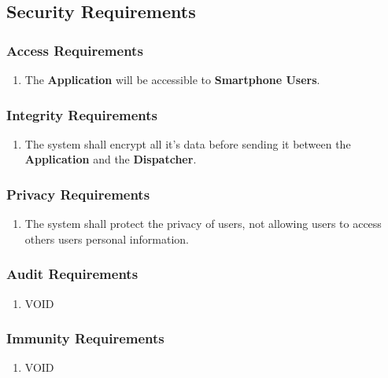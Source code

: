 \documentclass[english]{article}
\begin{document}

\subsection{Security Requirements}
\label{sub:security_requirements}

\subsubsection{Access Requirements}
\label{ssub:access_requirements}
\begin{enumerate}[{SAR}1. ]
	\item The \textbf{Application} will be accessible to \textbf{Smartphone Users}. 
\end{enumerate}

\subsubsection{Integrity Requirements}
\label{ssub:integrity_requirements}
\begin{enumerate}[{SIR}1. ]
	\item The system shall encrypt all it's data before sending it between the \textbf{Application} and the \textbf{Dispatcher}. 
\end{enumerate}

\subsubsection{Privacy Requirements}
\label{ssub:privacy_requirements}
\begin{enumerate}[{SPR}1. ]
	\item The system shall protect the privacy of users, not allowing users to access others users personal information.
\end{enumerate}

\subsubsection{Audit Requirements}
\label{ssub:audit_requirements}
\begin{enumerate}[{SAUR}1. ]
	\item VOID
\end{enumerate}

\subsubsection{Immunity Requirements}
\label{ssub:immunity_requirements}
\begin{enumerate}[{SIMR}1. ]
	\item VOID
\end{enumerate}
\end{document}
